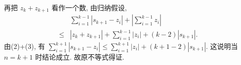再把 $z_k+z_{k+1}$ 看作一个数, 由归纳假设,
$$
\begin{aligned}
& \sum_{i=1}^{k-1}\left|s_{k+1}-z_i\right|+\left|\sum_{i=1}^{k-1} z_i\right| \\
\leqslant & \left|z_k+z_{k+1}\right|+\sum_{i=1}^{k-1}\left|z_i\right|+(k-2)\left|s_{k+1}\right| . 
\end{aligned} \label{(3)}
$$
由(2)+(3), 有 $\sum_{i=1}^{k+1}\left|s_{k+1}-z_i\right| \leqslant \sum_{i=1}^{k+1}\left|z_i\right|+(k+1-2)\left|s_{k+1}\right|$. 这说明当 $n=k+1$ 时结论成立.
故原不等式得证.


